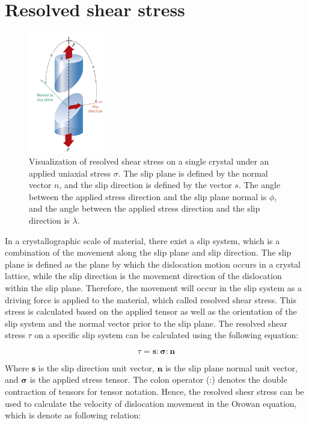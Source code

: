 \documentclass[12pt]{article}
\begin{document}
\section{Resolved shear stress}
\begin{figure}[H]
    \centering
    \includegraphics[width=0.3\textwidth]{images/RSS_New.png}
    \caption{Visualization of resolved shear stress on a single crystal under an applied uniaxial stress $\sigma$. 
    The slip plane is defined by the normal vector $n$, and the slip direction is defined by the vector $s$. 
    The angle between the applied stress direction and the slip plane normal is $\phi$, and the angle between 
    the applied stress direction and the slip direction is $\lambda$. \cite{callister2010}}
    \label{fig:resolved_shear_stress}
\end{figure}

\hspace{2em}In a crystallographic scale of material, there exist a slip system, which is a combination
of the movement along the slip plane and slip direction. The slip plane is defined as the plane by which 
the dislocation motion occurs in a crystal lattice, while the slip direction is the movement direction 
of the dislocation within the slip plane. Therefore, the movement will occur in the slip system as a driving
force is applied to the material, which called resolved shear stress. This stress is calculated based
on the applied tensor as well as the orientation of the slip system and the normal vector prior to the slip plane.
The resolved shear stress $\tau$ on a specific slip system can be calculated using the following equation:

\begin{equation}
    \tau = \boldsymbol{s} : \boldsymbol{\sigma} : \boldsymbol{n}
\end{equation}

Where $\boldsymbol{s}$ is the slip direction unit vector, $\boldsymbol{n}$ is the 
slip plane normal unit vector, and $\boldsymbol{\sigma}$ is the applied stress tensor. 
The colon operator (:) denotes the double contraction of tensors for tensor notation. Hence, the resolved shesr stress
can be used to calculate the velocity of dislocation movement in the Orowan equation, which is denote as following 
relation:
\end{document}
